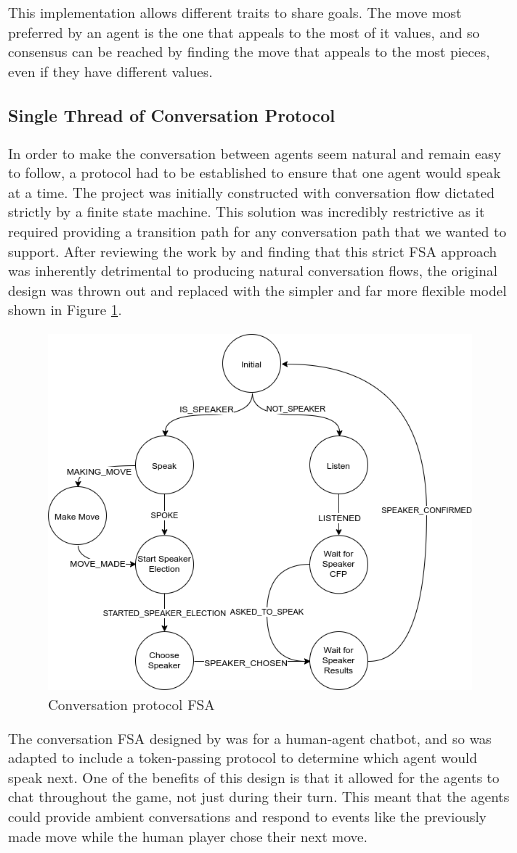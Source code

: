 \documentclass{article}
\begin{document}
This implementation allows different traits to share goals. The move most preferred by an agent is the one that appeals to the most of it values, and so consensus can be reached by finding the move that appeals to the most pieces, even if they have different values.

\subsubsection{Single Thread of Conversation Protocol}

In order to make the conversation between agents seem natural and remain easy to follow, a protocol had to be established to ensure that one agent would speak at a time. The project was initially constructed with conversation flow dictated strictly by a finite state machine. This solution was incredibly restrictive as it required providing a transition path for any conversation path that we wanted to support. After reviewing the work by \cite{tartan} and finding that this strict FSA approach was inherently detrimental to producing natural conversation flows, the original design was thrown out and replaced with the simpler and far more flexible model shown in Figure \ref{fig:conversationfsa}.

\begin{figure}[]
	\centering
	\includegraphics[width=0.8\linewidth]{images/conversationfsa}
	\caption{Conversation protocol FSA}
	\label{fig:conversationfsa}
\end{figure}

The conversation FSA designed by \cite{tartan} was for a human-agent chatbot, and so was adapted to include a token-passing protocol to determine which agent would speak next. One of the benefits of this design is that it allowed for the agents to chat throughout the game, not just during their turn. This meant that the agents could provide ambient conversations and respond to events like the previously made move while the human player chose their next move.
\end{document}
